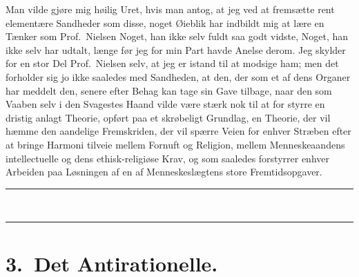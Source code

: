 Man vilde gjøre mig høilig Uret, hvis man antog, at jeg ved at fremsætte rent
elementære Sandheder som disse, noget Øieblik har indbildt mig at lære en
Tænker som Prof.\ Nielsen Noget, han ikke selv fuldt saa godt vidste, Noget,
han ikke selv har udtalt, længe før jeg for min Part havde Anelse derom. Jeg
skylder for en stor Del Prof.\ Nielsen selv, at jeg er istand til at modsige
ham; men det forholder sig jo ikke saaledes med Sandheden, at den, der som et
af dens Organer har meddelt den, senere efter Behag kan tage sin Gave
tilbage, naar den som Vaaben selv i den Svagestes Haand vilde være stærk nok
til at for%
styrre en dristig anlagt Theorie, opført paa et skrøbeligt
Grundlag, en Theorie, der vil hæmme den aandelige Fremskriden, der vil spærre
Veien for enhver Stræben efter at bringe Harmoni tilveie mellem Fornuft og
Religion, mellem Menneskeaandens intellectuelle og dens ethisk-religiøse
Krav, og som saaledes forstyrrer enhver Arbeiden paa Løsningen af en af
Menneskeslægtens store Fremtidsopgaver.

\begin{center}
\rule{2cm}{0.4pt}\\[-4pt]
\rule{2cm}{0.4pt}
\end{center}

\chapter*{3.\ Det Antirationelle.}
\label{ch:3}

